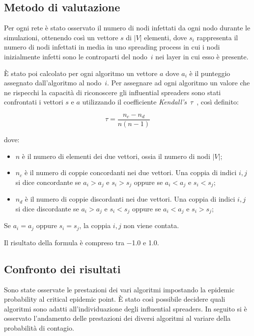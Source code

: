 \subsection{Metodo di valutazione}
Per ogni rete è stato osservato il numero di nodi infettati da ogni nodo durante le simulazioni, 
ottenendo così un vettore $s$ di $|V|$ elementi, dove $s_i$ rappresenta il numero di nodi 
infettati in media in uno spreading process in cui i nodi inizialmente infetti sono le controparti del 
nodo~$i$ nei layer in cui esso è presente.

È stato poi calcolato per ogni algoritmo un vettore $a$ dove $a_i$ 
è il punteggio assegnato dall'algoritmo al nodo~$i$.
Per assegnare ad ogni algoritmo un valore che ne rispecchi la capacità di riconoscere 
gli influential spreaders sono stati confrontati i vettori $s$ e $a$ utilizzando il coefficiente 
\textit{Kendall's}~$\tau$~\cite{kendall:tau}, 
così definito:

\begin{equation*}
    \tau = \frac{n_c - n_d}{n(n-1)}
\end{equation*}

dove:
\begin{itemize}
    \setlength\itemsep{0pt}
    \item $n$ è il numero di elementi dei due vettori, ossia il numero di nodi $|V|$;
    \item $n_c$ è il numero di coppie concordanti nei due vettori. Una coppia di 
            indici $i, j$ si dice concordante se $a_i > a_j$ e $s_i > s_j$ oppure se $a_i < a_j$ e $s_i < s_j$;
    \item $n_d$ è il numero di coppie discordanti nei due vettori. Una coppia di 
    indici $i, j$ si dice discordante se $a_i > a_j$ e $s_i < s_j$ oppure se $a_i < a_j$ e $s_i > s_j$;    
\end{itemize}

Se $a_i = a_j$ oppure $s_i = s_j$, la coppia $i, j$ non viene contata.

Il risultato della formula è compreso tra \num{-1.0} e {1.0}.

\subsection{Confronto dei risultati}

Sono state osservate le prestazioni dei vari algoritmi impostando la epidemic probability
al critical epidemic point. È stato così possibile decidere quali algoritmi sono adatti 
all'individuazione degli influential spreaders. In seguito si è osservato 
l'andamento delle prestazioni dei diversi algoritmi al variare della 
probabilità di contagio.

